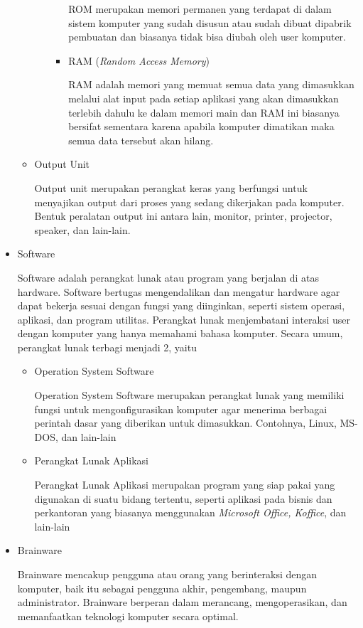 \documentclass[12pt]{article}
\begin{document}
\begin{itemize}
\begin{itemize}
\begin{itemize}
\begin{itemize}
                    \par
                    ROM merupakan memori permanen yang terdapat di dalam sistem komputer yang sudah disusun atau sudah dibuat dipabrik pembuatan dan biasanya tidak bisa diubah oleh user komputer.
                    \item RAM  (\textit{Random Access Memory})
                    \par
                    RAM adalah memori yang memuat semua data yang dimasukkan melalui alat input pada setiap aplikasi yang akan dimasukkan terlebih dahulu ke dalam memori main dan RAM ini biasanya bersifat sementara karena apabila komputer dimatikan maka semua data tersebut akan hilang.
                \end{itemize}
            \end{itemize}
        \item Output Unit 
        \par
        Output unit merupakan perangkat keras yang berfungsi untuk menyajikan output dari proses yang sedang dikerjakan pada komputer. Bentuk peralatan output ini antara lain, monitor, printer, projector, speaker, dan lain-lain.
        \end{itemize}
        
        \item Software 
        \par
        Software adalah perangkat lunak atau program yang berjalan di atas hardware. Software bertugas mengendalikan dan mengatur hardware agar dapat bekerja sesuai dengan fungsi yang diinginkan, seperti sistem operasi, aplikasi, dan program utilitas. Perangkat lunak menjembatani interaksi user dengan komputer yang hanya memahami bahasa komputer. Secara umum, perangkat lunak terbagi menjadi 2, yaitu
        \begin{itemize}
            \item Operation System Software
            \par
            Operation System Software merupakan perangkat lunak yang memiliki fungsi untuk mengonfigurasikan komputer agar menerima berbagai perintah dasar yang diberikan untuk dimasukkan. Contohnya, Linux, MS-DOS, dan lain-lain
            \item Perangkat Lunak Aplikasi
            \par
            Perangkat Lunak Aplikasi merupakan program yang siap pakai yang digunakan di suatu bidang tertentu, seperti aplikasi pada bisnis dan perkantoran yang biasanya menggunakan\textit{ Microsoft Office, Koffice}, dan lain-lain
        \end{itemize}
        \item Brainware 
        \par
        Brainware mencakup pengguna atau orang yang berinteraksi dengan komputer, baik itu sebagai pengguna akhir, pengembang, maupun administrator. Brainware berperan dalam merancang, mengoperasikan, dan memanfaatkan teknologi komputer secara optimal.
    \end{itemize}
   
\end{document}
